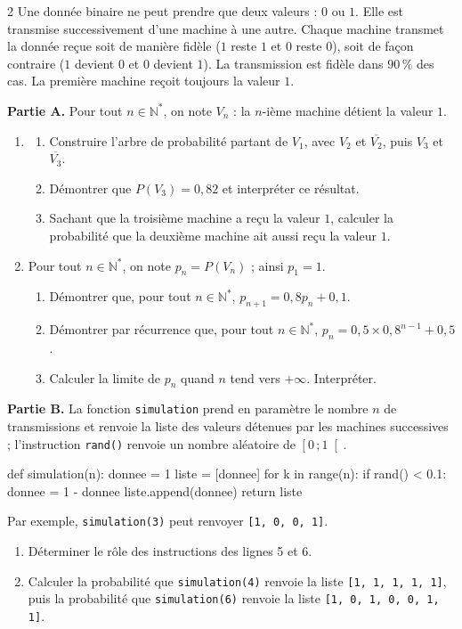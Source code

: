 \documentclass[a4paper,10pt]{article}
\makeatletter
\newcommand{\Ns}{\mathbb{N}^{*}}
\newcommand{\lycee@intfo}[2]{\left[#1\,;#2\right[}
\providecommand{\intfo}{\lycee@intfo}%
\makeatother
\begin{document}
\begin{multicols}{2}
Une donnée binaire ne peut prendre que deux valeurs : $0$ ou $1$. Elle est transmise
successivement d'une machine à une autre. Chaque machine transmet la donnée reçue soit de
manière fidèle ($1$ reste $1$ et $0$ reste $0$), soit de façon contraire ($1$ devient $0$ et
$0$ devient $1$). La transmission est fidèle dans $90\,\%$ des cas. La première machine
reçoit toujours la valeur $1$.

\textbf{Partie A.} Pour tout $n\in\Ns$, on note $V_{n}$ : \og la $n$-ième machine détient
la valeur $1$\fg.
\begin{enumerate}
  \item
  \begin{enumerate}[label=\alph*)]
    \item Construire l'arbre de probabilité partant de $V_{1}$, avec $V_{2}$ et
          $\overline{V_{2}}$, puis $V_{3}$ et $\overline{V_{3}}$.
    \item Démontrer que $P(V_{3})=0{,}82$ et interpréter ce résultat.
    \item Sachant que la troisième machine a reçu la valeur $1$, calculer la probabilité
          que la deuxième machine ait aussi reçu la valeur $1$.
  \end{enumerate}
  \item Pour tout $n\in\Ns$, on note $p_{n}=P(V_{n})$ ; ainsi $p_{1}=1$.
  \begin{enumerate}[label=\alph*)]
    \item Démontrer que, pour tout $n\in\Ns$, $p_{n+1}=0{,}8p_{n}+0{,}1$.
    \item Démontrer par récurrence que, pour tout $n\in\Ns$,
          $p_{n}=0{,}5\times 0{,}8^{n-1}+0{,}5$.
    \item Calculer la limite de $p_{n}$ quand $n$ tend vers $+\infty$. Interpréter.
  \end{enumerate}
\end{enumerate}

\textbf{Partie B.} La fonction \texttt{simulation} prend en paramètre le nombre $n$ de
transmissions et renvoie la liste des valeurs détenues par les machines successives ;
l'instruction \texttt{rand()} renvoie un nombre aléatoire de $\intfo{0}{1}$.
\begin{python}
def simulation(n):
    donnee = 1
    liste = [donnee]
    for k in range(n):
        if rand() < 0.1:
            donnee = 1 - donnee
        liste.append(donnee)
    return liste
\end{python}
Par exemple, \texttt{simulation(3)} peut renvoyer \texttt{[1, 0, 0, 1]}.
\begin{enumerate}
  \item Déterminer le rôle des instructions des lignes 5 et 6.
  \item Calculer la probabilité que \texttt{simulation(4)} renvoie la liste
        \texttt{[1, 1, 1, 1, 1]}, puis la probabilité que \texttt{simulation(6)} renvoie
        la liste \texttt{[1, 0, 1, 0, 0, 1, 1]}.
\end{enumerate}

\end{multicols}
\end{document}
